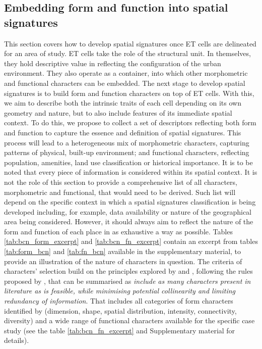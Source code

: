 \subsection{Embedding form and function into spatial signatures}
\label{ssec:ss_ff}

%
This section covers how to develop spatial signatures once ET cells are
delineated for an area of study.
ET cells take the role of the structural unit.
In themselves, they hold descriptive value in reflecting the configuration of
the urban environment. They also operate as a container, into which other
morphometric and functional characters can be embedded.
The next stage to develop spatial signatures is to build form and function
characters on top of ET cells. With this, we aim to describe both the
intrinsic traits of each cell depending on its own
geometry and nature, but to also include features of its immediate spatial
context.
To do this, we propose to collect a set of descriptors reflecting both form
and function to capture the essence and definition of spatial signatures.
%
This process will lead to a heterogeneous
mix of morphometric characters, capturing patterns of physical, built-up
environment; and functional characters, reflecting population, amenities,
land use classification or historical importance. It is to be noted that
every piece of information is considered within its spatial context.
It is not the role of this
section to provide a comprehensive list of all characters, morphometric and
functional, that would need to be derived. Such list will depend on the
specific context in which a spatial signatures classification is being
developed including, for example, data availability or nature of the
geographical area being considered.
%
However, it should always aim to reflect the nature of the form and function of each
place in as exhaustive a way as possible. Tables \ref{tab:bcn_form_excerpt} and
\ref{tab:bcn_fn_excerpt} contain an excerpt from tables \ref{tab:form_bcn} and
\ref{tab:fn_bcn} available in the supplementary material, to provide an illustration of
the nature of characters in question. The criteria of characters' selection build on the
principles explored by \cite{dibble2019origin} and \cite{fleischmann2021methodological},
following the rules proposed by \cite{sneath1973numerical}, that can be summarised as
\emph{include as many characters present in literature as is feasible, while minimising
potential collinearity and limiting redundancy of information}. That includes all
categories of form characters identified by \cite{fleischmann2020measuring} (dimension,
shape, spatial distribution, intensity, connectivity, diversity) and a wide range of
functional characters available for the specific case study (see the table
\ref{tab:bcn_fn_excerpt} and Supplementary material for details).


